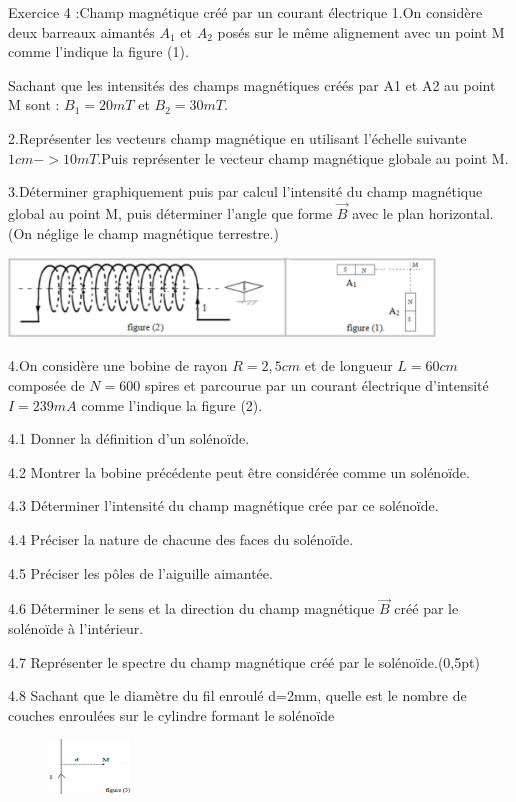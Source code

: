 \documentclass[12pt, french]{article}
\begin{document}
\begin{Box2}{Exercice 4 :Champ magnétique créé par un courant électrique  }
1.On considère deux barreaux aimantés $A_1$ et $A_2$ posés sur le même alignement avec un point M comme l'indique la
figure (1).

Sachant que les intensités des champs magnétiques créés par A1 et A2 au point M sont : $B_1=20mT$ et $B_2=30mT$.

2.Représenter les vecteurs champ magnétique en utilisant l'échelle suivante $1cm ->10mT$.Puis représenter le vecteur champ magnétique globale au point M.

3.Déterminer graphiquement puis par calcul l'intensité du champ magnétique 
   global au point M, puis déterminer l'angle que forme $\vec{B}$ avec le plan horizontal.(On néglige le champ magnétique terrestre.)
  \begin{center}
     \includegraphics[width=0.85\textwidth]{./img/Exo__sol.png}
  \end{center}
4.On considère une bobine de rayon $R=2,5cm$ et de longueur $L=60cm$ composée de $N=600$ spires et parcourue par un courant électrique d'intensité $I=239mA$ comme l'indique la figure (2).

4.1 Donner la définition d'un solénoïde.

   4.2 Montrer la bobine précédente peut être considérée comme un solénoïde.

   4.3 Déterminer l'intensité du champ magnétique crée par ce solénoïde.

   4.4 Préciser la nature de chacune des faces du solénoïde.

   4.5 Préciser les pôles de l'aiguille aimantée.

   4.6  Déterminer le sens et la direction du champ magnétique $\vec{B}$ créé par le solénoïde à l'intérieur.

   4.7 Représenter le spectre du champ magnétique créé par le solénoïde.(0,5pt)

   4.8 Sachant que le diamètre du fil enroulé d=2mm, quelle est le nombre de couches enroulées sur le cylindre formant le solénoïde

   \begin{figure}
  \begin{center}
     \includegraphics[width=0.2\textwidth]{./img/Exo_fil.png}
  \end{center}
\end{figure}



\end{Box2}
\end{document}
